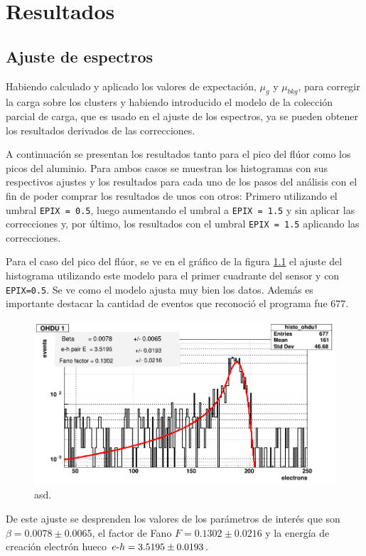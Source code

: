 \chapter{Resultados \label{chap:Resultados}}
\section{Ajuste de espectros}
\noindent Habiendo calculado y aplicado los valores de expectación, $\mu_{g}$ y $\mu_{bkg}$, para corregir la carga sobre los clusters y habiendo introducido el modelo de la colección parcial de carga, que es usado en el ajuste de los espectros, ya se pueden obtener los resultados derivados de las correcciones.

A continuación se presentan los resultados tanto para el pico del flúor como los picos del aluminio. Para ambos casos se muestran los histogramas con sus respectivos ajustes y los resultados para cada uno de los pasos del análisis con el fin de poder comprar los resultados de unos con otros: Primero utilizando el umbral \verb|EPIX = 0.5|, luego aumentando el umbral a \verb|EPIX = 1.5| y sin aplicar las correcciones y, por último, los resultados con el umbral \verb|EPIX = 1.5| aplicando las correcciones.

Para el caso del pico del flúor, se ve en el gráfico de la figura \ref{fig:F_OHDU0_EPIX05} el ajuste del histograma utilizando este modelo para el primer cuadrante del sensor y con \verb|EPIX=0.5|. Se ve como el modelo ajusta muy bien los datos. Además es importante destacar la cantidad de eventos que reconoció el programa fue $677$. 
\begin{figure}[h]
    \centering
        \includegraphics[scale=0.4]{pngs/F_OHDU0_EPIX05.png}
    \caption{\footnotesize{asd.}}
    \label{fig:F_OHDU0_EPIX05}
\end{figure}
De este ajuste se desprenden los valores de los parámetros de interés que son $\beta = 0.0078 \pm 0.0065$, el factor de Fano $F = 0.1302 \pm 0.0216$ y la energía de creación electrón hueco $e\mbox{-}h = 3.5195 \pm 0.0193$.

